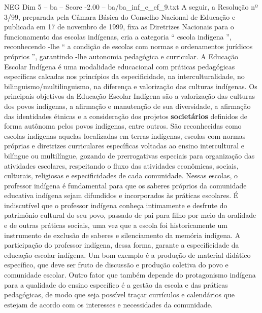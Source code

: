 \begin{textsample}{NEG Dim 5 – ba – Score -2.00 – ba/ba\_inf\_e\_ef\_9.txt}
A seguir, a Resolução nº 3/99, preparada pela Câmara Básica do Conselho Nacional de Educação e publicada em 17 de novembro de 1999, fixa as Diretrizes Nacionais para o funcionamento das escolas indígenas, cria a categoria “ escola indígena ”, reconhecendo -lhe “ a condição de escolas com normas e ordenamentos jurídicos próprios ”, garantindo -lhe autonomia pedagógica e curricular.
A Educação Escolar Indígena é uma modalidade educacional com práticas pedagógicas específicas calcadas nos princípios da especificidade, na interculturalidade, no bilinguismo/multilinguismo, na diferença e valorização das culturas indígenas.
Os principais objetivos da Educação Escolar Indígena são a valorização das culturas dos povos indígenas, a afirmação e manutenção de sua diversidade, a afirmação das identidades étnicas e a consideração dos projetos \textbf{societários} definidos de forma autônoma pelos povos indígenas, entre outros.
São reconhecidas como escolas indígenas aquelas localizadas em terras indígenas, escolas com normas próprias e diretrizes curriculares específicas voltadas ao ensino intercultural e bilíngue ou multilíngue, gozando de prerrogativas especiais para organização das atividades escolares, respeitando o fluxo das atividades econômicas, sociais, culturais, religiosas e especificidades de cada comunidade.
Nessas escolas, o professor indígena é fundamental para que os saberes próprios da comunidade educativa indígena sejam difundidos e incorporados às práticas escolares.
É indiscutível que o professor indígena conheça intimamente e desfrute do patrimônio cultural do seu povo, passado de pai para filho por meio da oralidade e de outras práticas sociais, uma vez que a escola foi historicamente um instrumento de exclusão de saberes e silenciamento da memória indígena.
A participação do professor indígena, dessa forma, garante a especificidade da educação escolar indígena.
Um bom exemplo é a produção de material didático específico, que deve ser fruto de discussão e produção coletiva do povo e comunidade escolar.
Outro fator que também depende do protagonismo indígena para a qualidade do ensino específico é a gestão da escola e das práticas pedagógicas, de modo que seja possível traçar currículos e calendários que estejam de acordo com os interesses e necessidades da comunidade.

\end{textsample}
